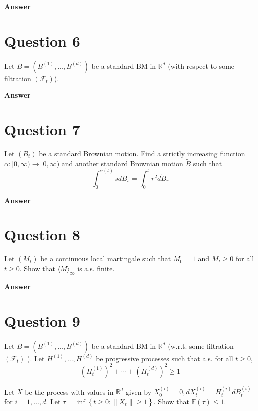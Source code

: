 \documentclass[letterpaper]{article}
\begin{document}
		
		\textbf{Answer}
		
		\clearpage
		
		\section{Question 6}
		
		Let $B=\left(B^{(1)}, \ldots, B^{(d)}\right)$ be a standard BM in
		$\mathbb{R}^d$ (with respect to some filtration $(\mathcal{F}_t)$).
		
		\textbf{Answer}
		
		\clearpage
		
		\section{Question 7}
		
		Let $(B_t)$ be a standard Brownian motion. Find a strictly
		increasing function $\alpha:[0,\infty)\to[0,\infty)$ and another standard
		Brownian motion $\tilde{B}$ such that $$
		\int_{0}^{\alpha(t)} s d B_{s}=\int_{0}^{t} r^{2} d \tilde{B}_{r}
		$$
		
		\textbf{Answer}
		
		\clearpage
		
		\section{Question 8}
		
		Let $\left(M_{t}\right)$ be a continuous local martingale such that $M_{0}=1$ and $M_{t} \geq 0$ for all $t \geq 0$. Show that $\langle M\rangle_{\infty}$ is a.s. finite.
		
		\textbf{Answer}
		
		\clearpage
		
		\section{Question 9}
		
		Let $B=\left(B^{(1)}, \ldots, B^{(d)}\right)$ be a standard BM in $\mathbb{R}^{d}$ (w.r.t. some filtration $\left(\mathcal{F}_{t}\right)$ ). Let $H^{(1)}, \ldots, H^{(d)}$ be progressive processes such that a.s. for all $t \geq 0$,
		$$
		\left(H_{t}^{(1)}\right)^{2}+\cdots+\left(H_{t}^{(d)}\right)^{2} \geq 1
		$$
		
		Let $X$ be the process with values in $\mathbb{R}^{d}$ given by $X_{0}^{(i)}=0, d X_{t}^{(i)}=H_{t}^{(i)} d B_{t}^{(i)}$ for $i=1, \ldots, d$. Let $\tau=\inf \left\{t \geq 0:\left\|X_{t}\right\| \geq 1\right\}$. Show that $\mathbb{E}(\tau) \leq 1$.
		
\end{document}

